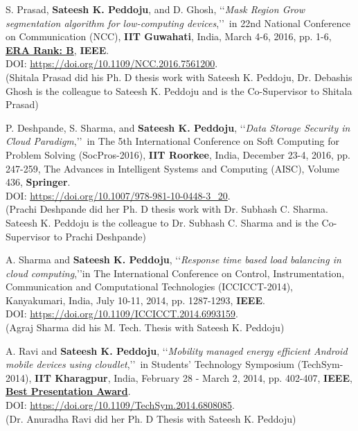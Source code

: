 \begin{etaremune}
	
	\item
	S. Prasad, \textbf{Sateesh K. Peddoju}, and D. Ghosh, \lq\lq \textit{Mask Region Grow segmentation algorithm for low-computing devices},\rq\rq\, in 22nd National Conference on Communication (NCC), \textbf{IIT Guwahati}, India, March 4-6, 2016, pp. 1-6, \underline{\textbf{ERA Rank: B}}, \textbf{IEEE}. \\DOI: \url{https://doi.org/10.1109/NCC.2016.7561200}. \\(Shitala Prasad did his Ph. D thesis work with Sateesh K. Peddoju, Dr. Debashis Ghosh is the colleague to Sateesh K. Peddoju and is the Co-Supervisor to Shitala Prasad)

	
	\item
	P. Deshpande, S. Sharma, and \textbf{Sateesh K. Peddoju}, \lq\lq \textit{Data Storage Security in Cloud Paradigm},\rq\rq\, in The 5th International Conference on Soft Computing for Problem Solving (SocPros-2016), \textbf{IIT Roorkee}, India, December 23-4, 2016, pp. 247-259, The Advances in Intelligent Systems and Computing (AISC), Volume 436,  \textbf{Springer}. \\DOI:
\url{https://doi.org/10.1007/978-981-10-0448-3_20}. \\(Prachi Deshpande did her Ph. D thesis work with Dr. Subhash C. Sharma. Sateesh K. Peddoju is the colleague to Dr. Subhash C. Sharma and is the Co-Supervisor to Prachi Deshpande)

	
	\item
	A. Sharma and \textbf{Sateesh K. Peddoju}, \lq\lq \textit{Response time based load balancing in cloud computing},\rq\rq in The International Conference on Control, Instrumentation, Communication and Computational Technologies (ICCICCT-2014), Kanyakumari, India, July 10-11, 2014, pp. 1287-1293, \textbf{IEEE}. \\DOI: \url{https://doi.org/10.1109/ICCICCT.2014.6993159}. \\(Agraj Sharma did his M. Tech. Thesis with Sateesh K. Peddoju)

	
	\item
	A. Ravi and \textbf{Sateesh K. Peddoju}, \lq\lq \textit{Mobility managed energy efficient Android mobile devices using cloudlet},\rq\rq\, in Students' Technology Symposium (TechSym-2014), \textbf{IIT Kharagpur}, India, February 28 - March 2, 2014, pp. 402-407,  \textbf{IEEE}, \underline{\textbf{Best Presentation Award}}. \\DOI: \url{https://doi.org/10.1109/TechSym.2014.6808085}. \\(Dr. Anuradha Ravi did her Ph. D Thesis with Sateesh K. Peddoju)


\end{etaremune}
